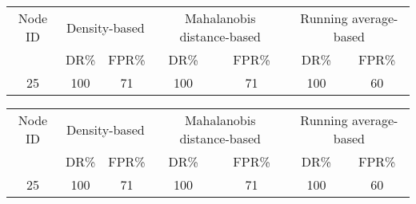 \documentclass{article}
\begin{document}
\begin{table}[htp]
            \centering
                \footnotesize\setlength{\tabcolsep}{2.5pt}

\renewcommand*{\arraystretch}{1.5}

\begin{tabular}{|c|c|c|c|c|c|c|}
\hline
Node ID   & \multicolumn{2}{c|}{Density-based} & \multicolumn{2}{c|}{Mahalanobis distance-based}    & \multicolumn{2}{c|}{Running average-based} \\ 
\cline{2-7} 
     & DR\%   &  FPR\%      & DR\%   &  FPR\%     & DR\%   &  FPR\% \\ \hline 
25   & 100    & 71          & 100    & 71         & 100    & 60      \\ \hline
    \end{tabular}
\end{table}


\renewcommand*{\arraystretch}{1.5}
\begin{tabular}{|c|*6{c|}}
\hline
Node ID   & \multicolumn{2}{c|}{Density-based} & \multicolumn{2}{c|}{Mahalanobis distance-based}    & \multicolumn{2}{c|}{Running average-based} \\ 
\cline{2-7} 
     & DR\%   &  FPR\%      & DR\%   &  FPR\%     & DR\%   &  FPR\% \\ \hline 
25   & 100    & 71          & 100    & 71         & 100    & 60      \\ \hline
    \end{tabular}
\end{document}

